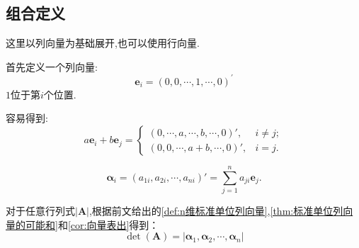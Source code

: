 \subsection{组合定义}
这里以列向量为基础展开,也可以使用行向量.
\begin{formal}
\begin{definition}[$n$维标准单位列向量]\label{def:n维标准单位列向量}
首先定义一个列向量:
\[
\bm{e}_i = \left(0,0,\cdots,1,\cdots
,0\right)^{\prime} 
\]
$1$位于第$i$个位置.
\end{definition}
\end{formal}
\begin{formal}
\begin{theorem}[标准单位列向量的可能和]\label{thm:标准单位列向量的可能和}
容易得到:
\begin{equation*}
    a\bm{e}_i + b\bm{e}_j = 
    \begin{cases}
        \left(0,\cdots,a,\cdots,b,\cdots,0\right)'
        , & i \neq j;\\
        \left(0,0,\cdots,a + b,\cdots,0\right)',
        & i = j.
    \end{cases}
\end{equation*}
\end{theorem}
\end{formal}
\begin{green}
\begin{corollary}[向量表出]\label{cor:向量表出}
\[
\bm{\alpha }_i =
\left(a_{1i},a_{2i},\cdots,a_{ni}\right)' = \sum_{
    j = 1
}^{n}a_{ji}\bm{e}_{j}.
\]
\end{corollary}
\end{green}
\begin{green}
\begin{corollary}[行列式的向量表示]\label{cor:行列式的向量表示}对于任意行列式$\left|\bm{A}\right|$,根据前文给出的\cref{def:n维标准单位列向量},\cref{thm:标准单位列向量的可能和}和\cref{cor:向量表出}得到：
    \[
 \det\left(\bm{A}\right) = 
\left|\bm{\alpha }_1,\bm{\alpha }_2,
\cdots,\bm{\alpha }_n \right|
\]
\end{corollary}
\end{green}

